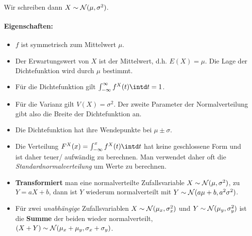 \begin{center}
\end{center}
Wir schreiben dann $X\sim\mathcal{N}(\mu,\sigma^2)$.
\paragraph{Eigenschaften:}
\begin{itemize}
	\item $f$ ist symmetrisch zum Mittelwert $\mu$.
	\item Der Erwartungswert von $X$ ist der Mittelwert, d.h. $E(X)=\mu$. Die Lage der Dichtefunktion wird durch $\mu$ bestimmt.
	\item Für die Dichtefunktion gilt $\int_{-\infty}^{\infty} f^X(t)\intd t = 1$.
	\item Für die Varianz gilt $V(X)=\sigma^2$. Der zweite Parameter der Normalverteilung gibt also die Breite der Dichtefunktion an.
	\item Die Dichtefunktion hat ihre Wendepunkte bei $\mu\pm\sigma$.
	\item Die Verteilung $F^X(x)=\int_{-\infty}^{x} f^X(t)\intd t$ hat keine geschlossene Form und ist daher teuer/ aufwändig zu berechnen. Man verwendet daher oft die \emph{Standardnormalverteilung} um Werte zu berechnen.
	\item {\bf Transformiert} man eine normalverteilte Zufallsvariable $X\sim\mathcal{N}(\mu,\sigma^2)$, zu $Y=aX+b$, dann ist $Y$ wiederum normalverteilt mit $Y\sim\mathcal{N}(a\mu+b, a^2\sigma^2)$.
	\item Für zwei \emph{unabhängige} Zufallsvariablen $X\sim\mathcal{N}(\mu_x,\sigma_x^2)$ und $ Y\sim\mathcal{N}(\mu_y,\sigma_y^2)$ ist die {\bf Summe} der beiden wieder normalverteilt, $(X+Y)\sim\mathcal{N}(\mu_x+\mu_y,\sigma_x+\sigma_y)$.
\end{itemize}

